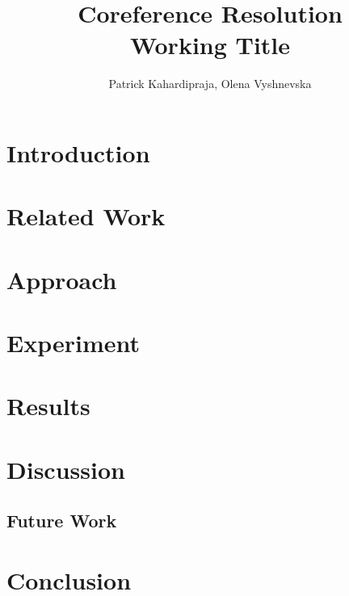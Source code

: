 \documentclass[11pt]{article}
\title{{\LARGE Coreference Resolution}\\[1.5mm]
{\large Working Title}\\[1.5mm]} %
\author{Patrick Kahardipraja, Olena Vyshnevska}%
\date{} %
\begin{document}
\maketitle


\section{Introduction}

\section{Related Work} 

\cite{tenney2019context}

\cite{liu2019linguistic}

\cite{joshi2019coref}

\cite{lee2018higher}


\section{Approach}



\section{Experiment}

\section{Results}

\section{Discussion}

\subsection{Future Work}

\section{Conclusion}

\nocite{*}

\printbibliography
\end{document}
